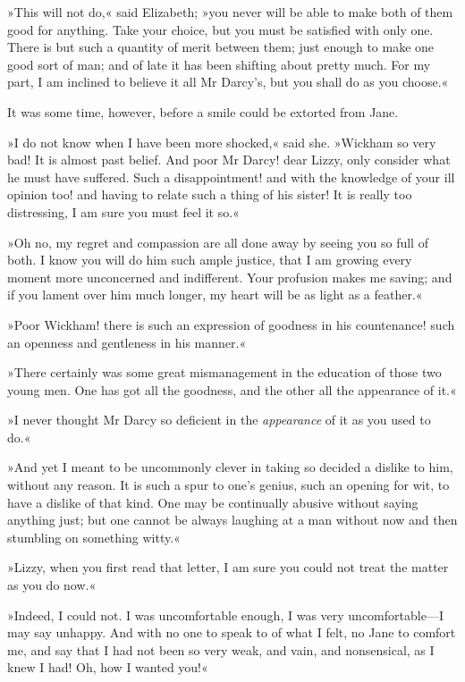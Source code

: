 »This will not do,« said Elizabeth; »you never will be able to make both of them good for anything. Take your choice, but you must be satisfied with only one. There is but such a quantity of merit between them; just enough to make one good sort of man; and of late it has been shifting about pretty much. For my part, I am inclined to believe it all Mr Darcy's, but you shall do as you choose.«

It was some time, however, before a smile could be extorted from Jane.

»I do not know when I have been more shocked,« said she. »Wickham so very bad! It is almost past belief. And poor Mr Darcy! dear Lizzy, only consider what he must have suffered. Such a disappointment! and with the knowledge of your ill opinion too! and having to relate such a thing of his sister! It is really too distressing, I am sure you must feel it so.«

»Oh no, my regret and compassion are all done away by seeing you so full of both. I know you will do him such ample justice, that I am growing every moment more unconcerned and indifferent. Your profusion makes me saving; and if you lament over him much longer, my heart will be as light as a feather.«

»Poor Wickham! there is such an expression of goodness in his countenance! such an openness and gentleness in his manner.«

»There certainly was some great mismanagement in the education of those two young men. One has got all the goodness, and the other all the appearance of it.«

»I never thought Mr Darcy so deficient in the \textit{appearance} of it as you used to do.«

»And yet I meant to be uncommonly clever in taking so decided a dislike to him, without any reason. It is such a spur to one's genius, such an opening for wit, to have a dislike of that kind. One may be continually abusive without saying anything just; but one cannot be always laughing at a man without now and then stumbling on something witty.«

»Lizzy, when you first read that letter, I am sure you could not treat the matter as you do now.«

»Indeed, I could not. I was uncomfortable enough, I was very uncomfortable—I may say unhappy. And with no one to speak to of what I felt, no Jane to comfort me, and say that I had not been so very weak, and vain, and nonsensical, as I knew I had! Oh, how I wanted you!«

